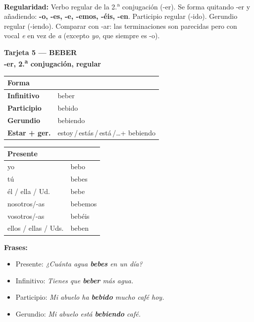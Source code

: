 \documentclass[a4paper,10pt]{article}
\newcommand{\verboheader}[3]{%
  \noindent
  \colorbox{azulverbo!90}{\parbox{\dimexpr\linewidth-2\fboxsep}{%
    \centering\color{white}\bfseries\large Tarjeta #1 --- #2\\[2pt]
    \normalsize #3%
  }}
  \vspace{4pt}
}
\begin{document}
\begin{trucoverbo}
\textbf{Regularidad:} Verbo regular de la 2.\textsuperscript{a} conjugación (-er). Se forma quitando -er y añadiendo: \textbf{-o, -es, -e, -emos, -éis, -en}. Participio regular (-ido). Gerundio regular (-iendo). Comparar con -ar: las terminaciones son parecidas pero con vocal \textit{e} en vez de \textit{a} (excepto \textit{yo}, que siempre es -o).
\end{trucoverbo}

\newpage

\verboheader{5}{BEBER}{-er, 2.\textsuperscript{a} conjugación, regular}

\begin{minipage}[t]{0.48\linewidth}
\small
\begin{tabular}{|>{\bfseries}l|l|}
\hline
\rowcolor{azulverbo!15} Forma & \\
\hline
Infinitivo & beber \\
\hline
\rowcolor{grisclaro}
Participio & bebido \\
\hline
Gerundio & bebiendo \\
\hline
\rowcolor{grisclaro}
Estar + ger. & estoy\,/\,estás\,/\,está\,/\ldots\;+ bebiendo \\
\hline
\end{tabular}
\end{minipage}
\hfill
\begin{minipage}[t]{0.48\linewidth}
\small
\begin{tabular}{|l|l|}
\hline
\rowcolor{azulverbo!15} \textbf{Presente} & \\
\hline
yo & bebo \\
\hline
\rowcolor{grisclaro}
tú & bebes \\
\hline
él / ella / Ud. & bebe \\
\hline
\rowcolor{grisclaro}
nosotros/-as & bebemos \\
\hline
vosotros/-as & bebéis \\
\hline
\rowcolor{grisclaro}
ellos / ellas / Uds. & beben \\
\hline
\end{tabular}
\end{minipage}

\vspace{4pt}
\small
\textbf{Frases:}
\begin{itemize}[nosep, leftmargin=1em]
\item Presente: \textit{¿Cuánta agua \textbf{bebes} en un día?}
\item Infinitivo: \textit{Tienes que \textbf{beber} más agua.}
\item Participio: \textit{Mi abuelo ha \textbf{bebido} mucho café hoy.}
\item Gerundio: \textit{Mi abuelo está \textbf{bebiendo} café.}
\end{itemize}
\end{document}
